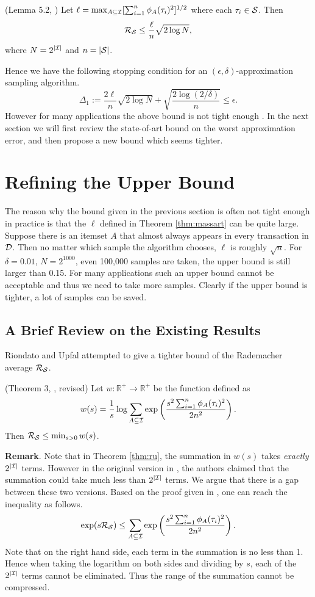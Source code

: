 \documentclass{article}
\begin{document}
\begin{theorem}
\label{thm:massart}
(Lemma 5.2, \cite{Mas00}) Let $\ell = \max_{A\subseteq\mathcal{I}} [\sum_{i=1}^n\phi_A(\tau_i)^2]^{1/2}$ where each $\tau_i\in\mathcal{S}$. Then
$$\mathcal{R}_{\mathcal{S}} \leq \frac{\ell}{n}\sqrt{2\log N},$$
where $N = 2^{|\mathcal{I}|}$ and $n = |\mathcal{S}|$.
\end{theorem}
Hence we have the following stopping condition for an $(\epsilon,\delta)$-approximation sampling algorithm.
$$\Delta_1 := \frac{2\ell}{n}\sqrt{2\log N} + \sqrt{\frac{2\log(2/\delta)}{n}} \leq \epsilon.$$
However for many applications the above bound is not tight enough \cite{RU15,RU16}. In the next section we will first review the state-of-art bound on the worst approximation error, and then propose a new bound which seems tighter.

\section{Refining the Upper Bound}
\label{sec:refine}
The reason why the bound given in the previous section is often not tight enough in practice is that the $\ell$ defined in Theorem \ref{thm:massart} can be quite large. Suppose there is an itemset $A$ that almost always appears in every transaction in $\mathcal{D}$. Then no matter which sample the algorithm chooses, $\ell$ is roughly $\sqrt{n}$. For $\delta=0.01$, $N = 2^{1000}$, even 100,000 samples are taken, the upper bound is still larger than 0.15. For many applications such an upper bound cannot be acceptable and thus we need to take more samples. Clearly if the upper bound is tighter, a lot of samples can be saved.

\subsection{A Brief Review on the Existing Results}
Riondato and Upfal \cite{RU15} attempted to give a tighter bound of the Rademacher average $\mathcal{R}_{\mathcal{S}}$. 

\begin{theorem}
\label{thm:ru}
(Theorem 3, \cite{RU15}, revised) Let $w : \mathbb{R}^+ \to \mathbb{R}^+$ be the function defined as
$$w(s) = \frac{1}{s}\log \sum_{A\subseteq\mathcal{I}}\exp\left(\frac{s^2 \sum_{i=1}^n \phi_A(\tau_i)^2}{2n^2}\right).$$
Then $\mathcal{R}_{\mathcal{S}} \leq \min_{s>0} w(s)$.
\end{theorem}

{\bf Remark}. Note that in Theorem \ref{thm:ru}, the summation in $w(s)$ takes \emph{exactly} $2^{|\mathcal{I}|}$ terms. However in the original version in \cite{RU15}, the authors claimed that the summation could take much less than $2^{|\mathcal{I}|}$ terms. We argue that there is a gap between these two versions. Based on the proof given in \cite{RU15}, one can reach the inequality as follows.
\begin{equation}
\label{eqn:ru}\exp(s\mathcal{R}_{\mathcal{S}}) \leq \sum_{A\subseteq\mathcal{I}}\exp\left(\frac{s^2\sum_{i=1}^n \phi_A(\tau_i)^2}{2n^2}\right).
\end{equation}
Note that on the right hand side, each term in the summation is no less than 1. Hence when taking the logarithm on both sides and dividing by $s$, each of the $2^{|\mathcal{I}|}$ terms cannot be eliminated. Thus the range of the summation cannot be compressed.
\end{document}

